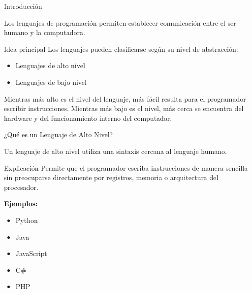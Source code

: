 \documentclass[10pt, aspectratio=169]{beamer}
\begin{document}
	\begin{frame}{Introducción}
		
		Los lenguajes de programación permiten establecer comunicación entre el ser humano y la computadora.
		
		\vspace{0.4cm}
		
		\begin{block}{Idea principal}
			Los lenguajes pueden clasificarse según su nivel de abstracción:
			\begin{itemize}
				\item Lenguajes de alto nivel
				\item Lenguajes de bajo nivel
			\end{itemize}
		\end{block}
		
		\vspace{0.3cm}
		
		Mientras más alto es el nivel del lenguaje, más fácil resulta para el programador escribir instrucciones.  
		Mientras más bajo es el nivel, más cerca se encuentra del hardware y del funcionamiento interno del computador.
		
	\end{frame}
	
	\begin{frame}{¿Qué es un Lenguaje de Alto Nivel?}
		
		Un lenguaje de alto nivel utiliza una sintaxis cercana al lenguaje humano.
		
		\vspace{0.5cm}
		
		\begin{block}{Explicación}
			Permite que el programador escriba instrucciones de manera sencilla sin preocuparse directamente por registros, memoria o arquitectura del procesador.
		\end{block}
		
		\vspace{0.4cm}
		
		\textbf{Ejemplos:}
		
		\begin{itemize}
			\item Python
			\item Java
			\item JavaScript
			\item C\#
			\item PHP
		\end{itemize}
		
	\end{frame}
	
\end{document}
